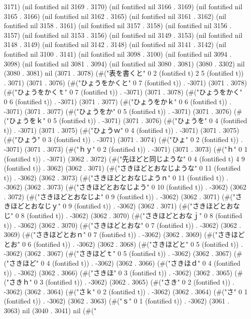 3171) (nil fontified nil 3169 . 3170) (nil fontified nil 3166 . 3169) (nil fontified nil 3165 . 3166) (nil fontified nil 3162 . 3165) (nil fontified nil 3161 . 3162) (nil fontified nil 3158 . 3161) (nil fontified nil 3157 . 3158) (nil fontified nil 3156 . 3157) (nil fontified nil 3153 . 3156) (nil fontified nil 3149 . 3153) (nil fontified nil 3148 . 3149) (nil fontified nil 3142 . 3148) (nil fontified nil 3141 . 3142) (nil fontified nil 3100 . 3141) (nil fontified nil 3098 . 3100) (nil fontified nil 3094 . 3098) (nil fontified nil 3081 . 3094) (nil fontified nil 3080 . 3081) (3080 . 3302) nil (3080 . 3081) nil (3071 . 3078) (#("表を書くと" 0 2 (fontified t) 2 5 (fontified t)) . 3071) (3071 . 3076) (#("ひょうをかくと" 0 7 (fontified t)) . -3071) (3071 . 3078) (#("ひょうをかくｔ" 0 7 (fontified t)) . -3071) (3071 . 3078) (#("ひょうをかく" 0 6 (fontified t)) . -3071) (3071 . 3077) (#("ひょうをかｋ" 0 6 (fontified t)) . -3071) (3071 . 3077) (#("ひょうをか" 0 5 (fontified t)) . -3071) (3071 . 3076) (#("ひょうをｋ" 0 5 (fontified t)) . -3071) (3071 . 3076) (#("ひょうを" 0 4 (fontified t)) . -3071) (3071 . 3075) (#("ひょうｗ" 0 4 (fontified t)) . -3071) (3071 . 3075) (#("ひょう" 0 3 (fontified t)) . -3071) (3071 . 3074) (#("ひょ" 0 2 (fontified t)) . -3071) (3071 . 3073) (#("ｈｙ" 0 2 (fontified t)) . -3071) (3071 . 3073) (#("ｈ" 0 1 (fontified t)) . -3071) (3062 . 3072) (#("先ほどと同じような" 0 4 (fontified t) 4 9 (fontified t)) . 3062) (3062 . 3071) (#("さきほどとおなじような" 0 11 (fontified t)) . -3062) (3062 . 3073) (#("さきほどとおなじようｎ" 0 11 (fontified t)) . -3062) (3062 . 3073) (#("さきほどとおなじよう" 0 10 (fontified t)) . -3062) (3062 . 3072) (#("さきほどとおなじよ" 0 9 (fontified t)) . -3062) (3062 . 3071) (#("さきほどとおなじｙ" 0 9 (fontified t)) . -3062) (3062 . 3071) (#("さきほどとおなじ" 0 8 (fontified t)) . -3062) (3062 . 3070) (#("さきほどとおなｊ" 0 8 (fontified t)) . -3062) (3062 . 3070) (#("さきほどとおな" 0 7 (fontified t)) . -3062) (3062 . 3069) (#("さきほどとおｎ" 0 7 (fontified t)) . -3062) (3062 . 3069) (#("さきほどとお" 0 6 (fontified t)) . -3062) (3062 . 3068) (#("さきほどと" 0 5 (fontified t)) . -3062) (3062 . 3067) (#("さきほどｔ" 0 5 (fontified t)) . -3062) (3062 . 3067) (#("さきほど" 0 4 (fontified t)) . -3062) (3062 . 3066) (#("さきほｄ" 0 4 (fontified t)) . -3062) (3062 . 3066) (#("さきほ" 0 3 (fontified t)) . -3062) (3062 . 3065) (#("さきｈ" 0 3 (fontified t)) . -3062) (3062 . 3065) (#("さき" 0 2 (fontified t)) . -3062) (3062 . 3064) (#("さｋ" 0 2 (fontified t)) . -3062) (3062 . 3064) (#("さ" 0 1 (fontified t)) . -3062) (3062 . 3063) (#("ｓ" 0 1 (fontified t)) . -3062) (3061 . 3063) nil (3040 . 3041) nil (#("
